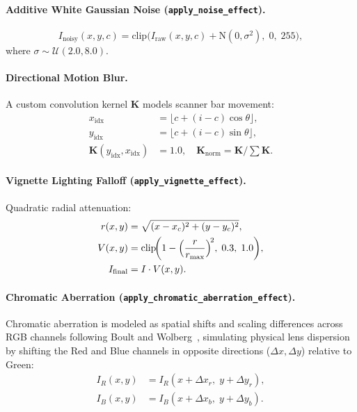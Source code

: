 \documentclass[11pt,twocolumn]{article}
\begin{document}
\paragraph{Additive White Gaussian Noise (\texttt{apply\_noise\_effect}).}
\begin{equation}\label{eq:awgn}
  I_{\text{noisy}}(x,y,c) = \text{clip}\!\bigl(I_{\text{raw}}(x,y,c) + \text{N}(0,\sigma^2),\; 0,\;255\bigr),
\end{equation}
where $\sigma \sim \mathcal{U}(2.0, 8.0)$.

\paragraph{Directional Motion Blur.} A custom convolution kernel $\mathbf{K}$ models scanner bar movement:
\begin{align}
  x_{\text{idx}} &= \lfloor c + (i-c)\cos\theta\rfloor, \label{eq:motion_idx_x}\\
  y_{\text{idx}} &= \lfloor c + (i-c)\sin\theta\rfloor, \label{eq:motion_idx_y}\\
  \mathbf{K}(y_{\text{idx}}, x_{\text{idx}}) &= 1.0,\quad \mathbf{K}_{\text{norm}} = \mathbf{K}\Big/\!\sum\mathbf{K}. \label{eq:motion_kernel}
\end{align}

\paragraph{Vignette Lighting Falloff (\texttt{apply\_vignette\_effect}).} Quadratic radial attenuation:
\begin{align}
  r(x,y) &= \sqrt{(x-x_c)^2+(y-y_c)^2}, \label{eq:vig_r}\\
  V(x,y) &= \text{clip}\!\biggl(1 - \Bigl(\frac{r}{r_{\max}}\Bigr)^{\!2},\; 0.3,\; 1.0\biggr), \label{eq:vig_V}\\
  I_{\text{final}} &= I \cdot V(x,y). \label{eq:vig_final}
\end{align}

\paragraph{Chromatic Aberration (\texttt{apply\_chromatic\_aberration\_effect}).} Chromatic aberration is modeled as spatial shifts and scaling differences across RGB channels following Boult and Wolberg~\cite{boult1992correcting}, simulating physical lens dispersion by shifting the Red and Blue channels in opposite directions ($\Delta x, \Delta y$) relative to Green:
\begin{align}
  I_R(x,y) &= I_R(x+\Delta x_r,\; y+\Delta y_r), \label{eq:chrom_r}\\
  I_B(x,y) &= I_B(x+\Delta x_b,\; y+\Delta y_b). \label{eq:chrom_b}
\end{align}
\end{document}
